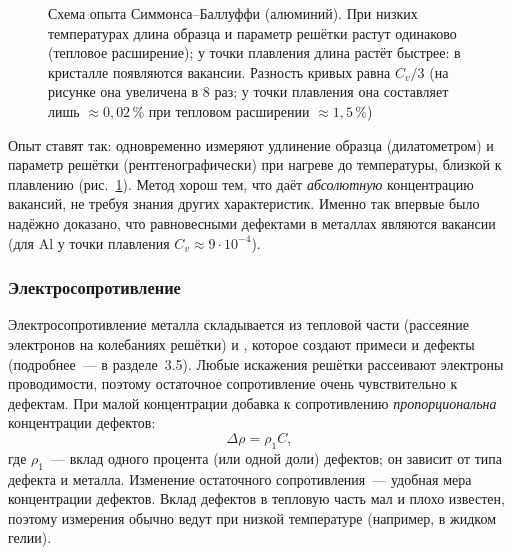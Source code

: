 \begin{figure}[ht]
\centering
{}
\caption{Схема опыта Симмонса--Баллуффи (алюминий). При низких температурах
длина образца и параметр решётки растут одинаково (тепловое расширение);
у точки плавления длина растёт быстрее: в кристалле появляются вакансии.
Разность кривых равна $C_v/3$ (на рисунке она увеличена в 8 раз; у точки
плавления она составляет лишь $\approx0{,}02\,\%$ при тепловом расширении
$\approx1{,}5\,\%$)}
\label{fig:simmons}
\end{figure}

Опыт ставят так: одновременно измеряют удлинение образца (дилатометром)
и параметр решётки (рентгенографически) при нагреве до температуры,
близкой к плавлению (рис.~\ref{fig:simmons}). Метод хорош тем, что даёт
\emph{абсолютную} концентрацию вакансий, не требуя знания других
характеристик. Именно так впервые было надёжно доказано, что
равновесными дефектами в металлах являются вакансии (для Al у точки
плавления $C_v\approx9\cdot10^{-4}$).

\subsubsection{Электросопротивление}

Электросопротивление металла складывается из тепловой части (рассеяние
электронов на колебаниях решётки) и ,
которое создают примеси и дефекты (подробнее~— в разделе~3.5). Любые
искажения решётки рассеивают электроны проводимости, поэтому остаточное
сопротивление очень чувствительно к дефектам. При малой концентрации
добавка к сопротивлению \emph{пропорциональна} концентрации дефектов:
\[
\Delta\rho=\rho_1C,
\]
где $\rho_1$~— вклад одного процента (или одной доли) дефектов; он
зависит от типа дефекта и металла. Изменение остаточного сопротивления~—
удобная мера концентрации дефектов. Вклад дефектов в тепловую часть мал
и плохо известен, поэтому измерения обычно ведут при низкой температуре
(например, в жидком гелии).

